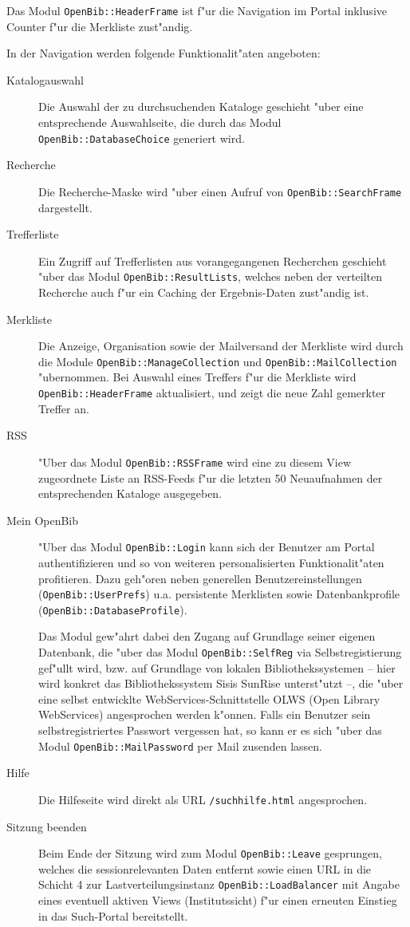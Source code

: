 \documentclass[11pt, twoside, a4paper, BCOR8mm, DIV12, bibtotoc,idxtotoc]{scrbook}
\begin{document}
\begin{itemize}
Das Modul \texttt{OpenBib::HeaderFrame} ist f"ur die Navigation im Portal
inklusive Counter f"ur die Merkliste zust"andig.

In der Navigation werden folgende Funktionalit"aten angeboten:

\begin{description}
\item[Katalogauswahl] Die Auswahl der zu durchsuchenden Kataloge geschieht
  "uber eine entsprechende Aus\-wahl\-seite, die durch das Modul
  \texttt{OpenBib::DatabaseChoice} generiert wird.
\item[Recherche] Die Recherche-Maske wird "uber einen Aufruf von
  \texttt{OpenBib::SearchFrame} dargestellt.
\item[Trefferliste] Ein Zugriff auf Trefferlisten aus vorangegangenen
  Recherchen geschieht "uber das Modul \texttt{OpenBib::ResultLists},
  welches neben der verteilten Recherche auch f"ur ein Caching der
  Ergebnis-Daten zust"andig ist.
\item[Merkliste] Die Anzeige, Organisation sowie der Mailversand der
  Merkliste wird durch die Module
  \texttt{OpenBib::ManageCollection} und \texttt{OpenBib::MailCollection}
  "uber\-nom\-men. Bei Auswahl eines Treffers f"ur die Merkliste wird
  \texttt{OpenBib::HeaderFrame} aktualisiert, und zeigt die neue Zahl
  gemerkter Treffer an.
\item[RSS] "Uber das Modul \texttt{OpenBib::RSSFrame} wird eine zu
  diesem View zugeordnete Liste an RSS-Feeds f"ur die letzten 50
  Neuaufnahmen der entsprechenden Kataloge ausgegeben.
\item[Mein OpenBib] "Uber das Modul \texttt{OpenBib::Login}
  kann sich der Benutzer am Portal authentifizieren und so von
  weiteren personalisierten Funktionalit"aten profitieren. Dazu
  geh"oren neben generellen Benutzereinstellungen
  (\texttt{OpenBib::UserPrefs}) u.a. per\-sis\-ten\-te Merklisten sowie
  Datenbankprofile (\texttt{OpenBib::DatabaseProfile}).

  Das Modul gew"ahrt dabei den Zugang auf Grundlage seiner eigenen
  Datenbank, die "uber das Modul \texttt{OpenBib::SelfReg} via
  Selbstregistierung gef"ullt wird, bzw. auf Grundlage von lokalen
  Bibliothekssystemen -- hier wird konkret das Bibliothekssystem Sisis
  SunRise unterst"utzt --, die "uber eine selbst entwicklte
  WebServices-Schnittstelle OLWS (Open Library WebServices)
  angesprochen werden k"onnen. Falls ein Benutzer sein
  selbstregistriertes Passwort vergessen hat, so kann er es sich "uber
  das Modul \texttt{OpenBib::MailPassword} per Mail zusenden lassen.
\item[Hilfe] Die Hilfeseite wird direkt als URL
  \texttt{/suchhilfe.html} angesprochen.
\item[Sitzung beenden] Beim Ende der Sitzung wird zum Modul
  \texttt{OpenBib::Leave} gesprungen, welches die sessionrelevanten Daten
  entfernt sowie einen URL in die Schicht 4 zur Lastver\-teilungs\-instanz
  \texttt{OpenBib::LoadBalancer} mit Angabe eines eventuell aktiven Views
  (Institutssicht) f"ur einen er\-neu\-ten Einstieg in das Such-Portal
  bereitstellt.


\end{description}
\end{itemize}
\end{document}
